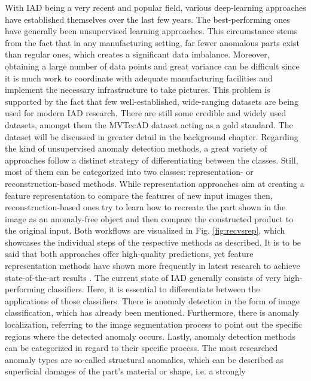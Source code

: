 With IAD being a very recent and popular field, various deep-learning approaches have established themselves over 
the last few years. The best-performing ones have generally been unsupervised learning approaches. This circumstance stems from the fact that 
in any manufacturing setting, far fewer anomalous parts exist than regular ones, which creates a significant data imbalance. 
Moreover, obtaining a large number of data points and great variance can be difficult since it is much work to 
coordinate with adequate manufacturing facilities and implement the necessary infrastructure to take pictures. This problem is supported 
by the fact that few well-established, wide-ranging datasets are being used for modern IAD research. There are still some credible and widely used 
datasets, amongst them the MVTecAD \cite{MVTEC_Bergmann_2021} dataset acting as a gold standard. The dataset will be discussed in greater detail 
in the background chapter. Regarding the kind of unsupervised anomaly detection methods, a great variety of approaches follow a 
distinct strategy of differentiating between the classes. Still, most of them can be categorized into two classes: representation- 
or reconstruction-based methods. While representation approaches aim at creating a feature representation to compare the features of new input images then, 
reconstruction-based ones try to learn how to recreate the part shown in the image as an anomaly-free object and then compare the constructed product to the original input. 
Both workflows are visualized in Fig. \ref{fig:recvsrep}, which showcases 
the individual steps of the respective methods as described. It is to be said that both approaches offer high-quality predictions, yet 
feature representation methods have shown more frequently in latest research to achieve state-of-the-art results \cite{liu2024deep}. %
\newline
The current state of IAD generally consists of very high-performing classifiers. Here, it is essential to differentiate between the 
applications of those classifiers. There is anomaly detection in the form of image classification, which has already been mentioned. 
Furthermore, there is anomaly localization, referring to the image segmentation process to point out the specific regions where 
the detected anomaly occurs. Lastly, anomaly detection methods can be categorized in regard to their specific process. The most researched anomaly types 
are so-called structural anomalies, which can be described as superficial damages of the part's material or shape, i.e. a strongly 

